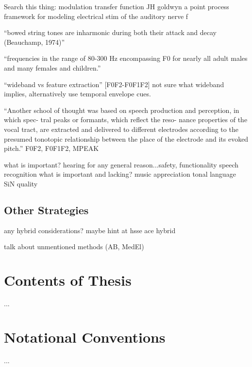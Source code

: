 \documentclass [11pt, proquest,oneside] {ganter_thesis}[2015/03/03]
\begin{document}
Search this thing:
modulation transfer function
JH goldwyn
a point process framework for modeling electrical stim of the auditory nerve
f

``bowed string tones are inharmonic during both their attack and decay (Beauchamp, 1974)''

``frequencies in the range of 80-300 Hz encompassing F0 for nearly all adult males and many females and children.''


``wideband vs feature extraction'' [F0F2-F0F1F2]
not sure what wideband implies, alternatively use temporal envelope cues.

``Another school of thought was based on speech production and perception, in which spec- tral peaks or formants, which reflect the reso- nance properties of the vocal tract, are extracted and delivered to different electrodes according to the presumed tonotopic relationship between the place of the electrode and its evoked pitch.'' %
F0F2, F0F1F2, MPEAK

    what is important?
        hearing for any general reason...safety, functionality
        speech recognition
    what is important and lacking?
        music appreciation
        tonal language
        SiN
        quality

\subsection{Other Strategies}

any hybrid considerations?  maybe hint at hsse ace hybrid

talk about unmentioned methods (AB, MedEl)


\section{Contents of Thesis}

...

\section{Notational Conventions}

...
\end{document}
